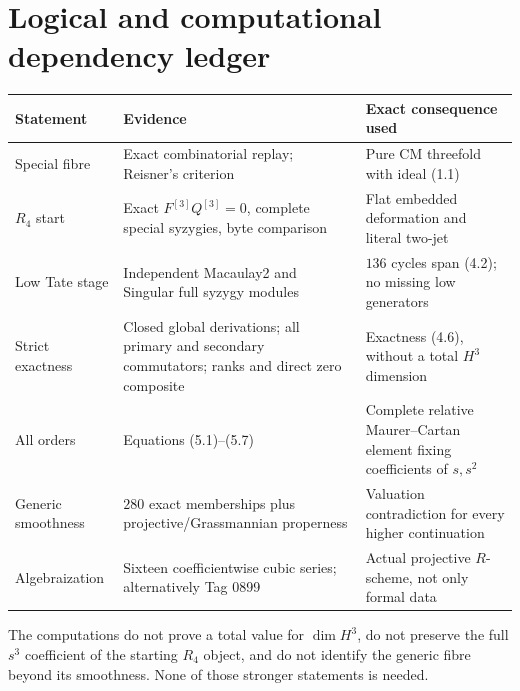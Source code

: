 \documentclass[11pt]{article}
\theoremstyle{definition}
\theoremstyle{remark}
\begin{document}
\section{Logical and computational dependency ledger}

\begin{center}
\begin{tabular}{p{}p{}p{}}
\toprule
Statement & Evidence & Exact consequence used\\
\midrule
Special fibre & Exact combinatorial replay; Reisner's criterion & Pure CM
threefold with ideal (1.1)\\
$R_4$ start & Exact $F^{[3]}Q^{[3]}=0$, complete special syzygies, byte
comparison & Flat embedded deformation and literal two-jet\\
Low Tate stage & Independent Macaulay2 and Singular full syzygy modules &
$136$ cycles span (4.2); no missing low generators\\
Strict exactness & Closed global derivations; all primary and secondary
commutators; ranks and direct zero composite & Exactness (4.6), without a
total $H^3$ dimension\\
All orders & Equations (5.1)--(5.7) & Complete relative Maurer--Cartan element
fixing coefficients of $s,s^2$\\
Generic smoothness & $280$ exact memberships plus projective/Grassmannian
properness & Valuation contradiction for every higher continuation\\
Algebraization & Sixteen coefficientwise cubic series; alternatively Tag
0899 & Actual projective $R$-scheme, not only formal data\\
\bottomrule
\end{tabular}
\end{center}

The computations do not prove a total value for $\dim H^3$, do not preserve
the full $s^3$ coefficient of the starting $R_4$ object, and do not identify
the generic fibre beyond its smoothness.  None of those stronger statements
is needed.
\end{document}
